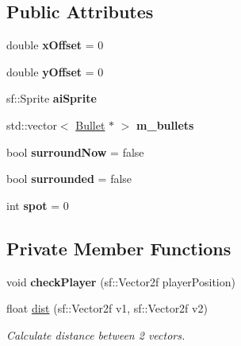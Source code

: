 \subsection*{Public Attributes}
\begin{DoxyCompactItemize}
\item 
\mbox{\label{class_a_i_ae3f69b95473b022ad5af6c465024ad5a}} 
double {\bfseries x\+Offset} = 0
\item 
\mbox{\label{class_a_i_a3b2db453a3efcce1f3cec554f0d761d7}} 
double {\bfseries y\+Offset} = 0
\item 
\mbox{\label{class_a_i_aa01d52f6dd63709f84d6bed5fc97e825}} 
sf\+::\+Sprite {\bfseries ai\+Sprite}
\item 
\mbox{\label{class_a_i_ae7da38bb99be1429d1e49506f9d63dd9}} 
std\+::vector$<$ \mbox{\hyperlink{class_bullet}{Bullet}} $\ast$ $>$ {\bfseries m\+\_\+bullets}
\item 
\mbox{\label{class_a_i_a091dbeb1117790b98e491276bbd2c6f2}} 
bool {\bfseries surround\+Now} = false
\item 
\mbox{\label{class_a_i_a2bc60baf014d42dbe86b4c8a73eef872}} 
bool {\bfseries surrounded} = false
\item 
\mbox{\label{class_a_i_a6439b76012c3b8669ce8997005ea7a80}} 
int {\bfseries spot} = 0
\end{DoxyCompactItemize}
\subsection*{Private Member Functions}
\begin{DoxyCompactItemize}
\item 
\mbox{\label{class_a_i_a80cacb38bc6ddb3717d9ae451c9d8d88}} 
void {\bfseries check\+Player} (sf\+::\+Vector2f player\+Position)
\item 
float \mbox{\hyperlink{class_a_i_a615bdfb1360b73d38f12e91903bd56a0}{dist}} (sf\+::\+Vector2f v1, sf\+::\+Vector2f v2)
\begin{DoxyCompactList}\small\item\em Calculate distance between 2 vectors. \end{DoxyCompactList}\end{DoxyCompactItemize}

